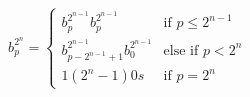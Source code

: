 \documentclass[11pt]{article}
\theoremstyle{definition}
\numberwithin{equation}{section}
\begin{document}
\[ b_{p}^{2^n} =
    \begin{cases}
      b_{p}^{2^{n-1}}b_{p}^{2^{n-1}} & \text{if } p\le2^{n-1} \\
	b_{p-2^{n-1}+1}^{2^{n-1}}b_{0}^{2^{n-1}} & \text{else if } p<2^{n} \\
	1(2^{n}-1)0s & \text{if } p=2^{n}
    \end{cases}
\]\\
\end{document}
